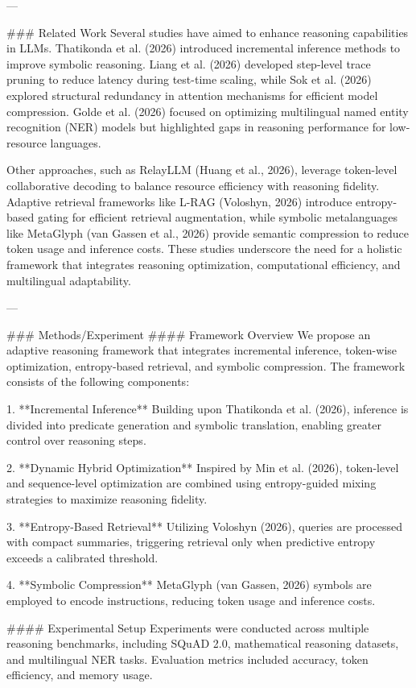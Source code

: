 ---

### Related Work  
Several studies have aimed to enhance reasoning capabilities in LLMs. Thatikonda et al. (2026) introduced incremental inference methods to improve symbolic reasoning. Liang et al. (2026) developed step-level trace pruning to reduce latency during test-time scaling, while Sok et al. (2026) explored structural redundancy in attention mechanisms for efficient model compression. Golde et al. (2026) focused on optimizing multilingual named entity recognition (NER) models but highlighted gaps in reasoning performance for low-resource languages.  

Other approaches, such as RelayLLM (Huang et al., 2026), leverage token-level collaborative decoding to balance resource efficiency with reasoning fidelity. Adaptive retrieval frameworks like L-RAG (Voloshyn, 2026) introduce entropy-based gating for efficient retrieval augmentation, while symbolic metalanguages like MetaGlyph (van Gassen et al., 2026) provide semantic compression to reduce token usage and inference costs. These studies underscore the need for a holistic framework that integrates reasoning optimization, computational efficiency, and multilingual adaptability.  

---

### Methods/Experiment  
#### Framework Overview  
We propose an adaptive reasoning framework that integrates incremental inference, token-wise optimization, entropy-based retrieval, and symbolic compression. The framework consists of the following components:  

1. **Incremental Inference**  
   Building upon Thatikonda et al. (2026), inference is divided into predicate generation and symbolic translation, enabling greater control over reasoning steps.  

2. **Dynamic Hybrid Optimization**  
   Inspired by Min et al. (2026), token-level and sequence-level optimization are combined using entropy-guided mixing strategies to maximize reasoning fidelity.  

3. **Entropy-Based Retrieval**  
   Utilizing Voloshyn (2026), queries are processed with compact summaries, triggering retrieval only when predictive entropy exceeds a calibrated threshold.  

4. **Symbolic Compression**  
   MetaGlyph (van Gassen, 2026) symbols are employed to encode instructions, reducing token usage and inference costs.  

#### Experimental Setup  
Experiments were conducted across multiple reasoning benchmarks, including SQuAD 2.0, mathematical reasoning datasets, and multilingual NER tasks. Evaluation metrics included accuracy, token efficiency, and memory usage.  

